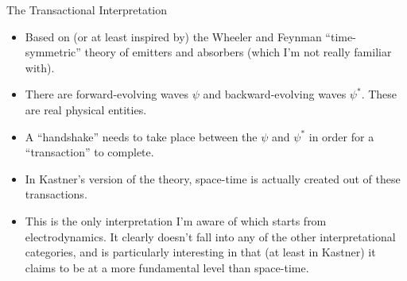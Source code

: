 \documentclass[9pt,usenames,dvipsnames]{beamer}
\begin{document}
\begin{frame}[t]{The Transactional Interpretation}
\begin{itemize}
\vspace{6pt}
\item Based on (or at least inspired by) the Wheeler and Feynman 
    ``time-symmetric'' theory of emitters and absorbers (which I'm not
    really familiar with).

\vspace{6pt}
\item There are forward-evolving waves $\psi$ and backward-evolving waves
      $\psi^*$. These are real physical entities.

\vspace{6pt}
\item A ``handshake'' needs to take place between the $\psi$ and $\psi^*$
      in order for a ``transaction'' to complete.

\vspace{6pt}
\item In Kastner's version of the theory, space-time is actually created
      out of these transactions.

\vspace{6pt}
\item This is the only interpretation I'm aware of which starts from
      electrodynamics. It clearly doesn't fall into any of the other
      interpretational categories, and is particularly interesting in that
      (at least in Kastner) it claims to be at a more fundamental level
      than space-time.

\end{itemize}
\end{frame}
\end{document}
